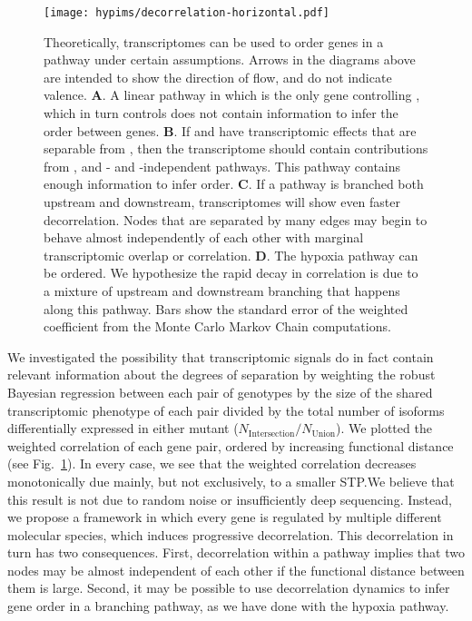 \begin{figure}[tbhp]
\centering
\texttt{[image: hypims/decorrelation-horizontal.pdf]}
\caption{
Theoretically, transcriptomes can be used to order genes in a pathway under
certain assumptions. Arrows in the diagrams above are intended to show the
direction of flow, and do not indicate valence.
\textbf{A}. A linear pathway in which  is the only gene controlling
, which in turn controls  does not contain information
to infer the order between genes.
\textbf{B}. If  and  have transcriptomic effects that are
separable from , then the  transcriptome should contain
contributions from ,  and - and
-independent pathways. This pathway contains enough information to
infer order.
\textbf{C}. If a pathway is branched both upstream and downstream,
transcriptomes will show even faster decorrelation. Nodes that are
separated by many edges may begin to behave almost independently of each other
with marginal transcriptomic overlap or correlation.
\textbf{D}. The hypoxia pathway can be ordered.
We hypothesize the rapid decay in correlation is due to a mixture of
upstream and downstream branching that happens along this pathway. Bars show the
standard error of the weighted coefficient from the Monte Carlo Markov Chain
computations.
}
\label{fig:decorrelation}
\end{figure}


We investigated the possibility that transcriptomic signals do in fact contain
relevant information about the degrees of separation by weighting the robust
Bayesian regression between each pair of genotypes by the size of the shared
transcriptomic phenotype of each pair divided by the total number of isoforms
differentially expressed in either mutant
($N_\mathrm{Intersection}/N_{\mathrm{Union}}$). We plotted the weighted
correlation of each gene pair, ordered by increasing functional distance
(see Fig.~\ref{fig:decorrelation}). In every case, we see that the weighted
correlation decreases monotonically due mainly, but not exclusively, to a smaller
STP.\@ We believe that this result is not due to random noise or insufficiently
deep sequencing. Instead, we propose a framework in which every gene is regulated
by multiple different molecular species, which induces progressive decorrelation.
This decorrelation in turn has two consequences. First, decorrelation within a
pathway implies that two nodes may be almost independent of each other if the
functional distance between them is large. Second, it may be possible to use
decorrelation dynamics to infer gene order in a branching pathway, as we have
done with the hypoxia pathway.

